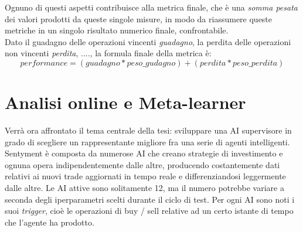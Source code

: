\documentclass[a4paper,12pt]{report}
\begin{document}
Ognuno di questi aspetti contribuisce alla metrica finale, che è una \textit{somma pesata} dei valori prodotti da queste singole misure, in modo da riassumere queste metriche in un singolo risultato numerico finale, confrontabile.\\ Dato il guadagno delle operazioni vincenti \textit{guadagno}, la perdita delle operazioni non vincenti \textit{perdita}, ...., la formula finale della metrica è:
\begin{equation}
performance=(guadagno*peso\_gudagno)+(perdita*peso\_perdita)
\end{equation}


\section{Analisi online e Meta-learner}
Verrà ora affrontato il tema centrale della tesi: sviluppare una AI supervisore in grado di scegliere un rappresentante migliore fra una serie di agenti intelligenti.\\
Sentyment è composta da numerose AI che creano strategie di investimento e ognuna opera indipendentemente dalle altre, producendo costantemente dati relativi ai nuovi trade aggiornati in tempo reale e differenziandosi leggermente dalle altre. Le AI attive sono solitamente 12, ma il numero potrebbe variare a seconda degli iperparametri scelti durante il ciclo di test. Per ogni AI sono noti i suoi \textit{trigger}, cioè le operazioni di buy / sell relative ad un certo istante di tempo che l'agente ha prodotto.
\end{document}
